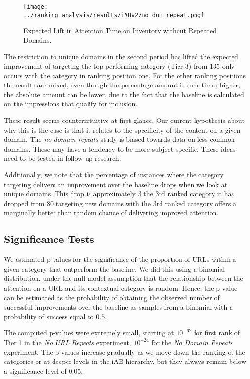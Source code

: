 \documentclass[sigconf]{acmart}
\begin{document}
\begin{figure*}
\texttt{[image: ../ranking\_analysis/results/iABv2/no\_dom\_repeat.png]}
\caption{Expected Lift in Attention Time on Inventory without Repeated Domains.}
\label{fig:no_dom}
\end{figure*}

The restriction to unique domains in the second period has lifted the expected improvement
of targeting the top performing category (Tier 3) from 135%
only occurs with the category in ranking position one. For the other ranking positions
the results are mixed, even though the percentage amount is sometimes higher, the
absolute amount can be lower, due to the fact that the baseline is calculated on
the impressions that qualify for inclusion.

These result seems counterintuitive at first glance. Our current hypothesis about why
this is the case is that it relates to the specificity of the content on a given domain.
The \emph{no domain repeats} study is biased towards data on less common domains.
These may have a tendency to be more subject specific.
These ideas need to be tested in follow up research.

Additionally, we note that the percentage of instances where the category targeting
delivers an improvement over the baseline drops when we look at unique domains.
This drop is approximately 3%
the 3rd ranked category it has dropped from 80%
targeting new domains with the 3rd ranked category offers a marginally better than
random chance of delivering improved attention.

\subsection{Significance Tests}

We estimated p-values for the significance of the proportion of URLs within a given category
that outperform the baseline. We did this using a binomial distribution, under the null model
assumption that the relationship between the attention on a URL and its contextual category
is random. Hence, the p-value can be estimated as the probability of obtaining the observed
number of successful improvements over the baseline as samples from a binomial with a probability
of success equal to $0.5$.

The computed p-values were extremely small, starting at $10^{-62}$ for first rank of Tier 1 in
the \emph{No URL Repeats} experiment, $10^{-24}$ for the \emph{No Domain Repeats} experiment.
The p-values increase gradually as we move down the ranking of the categories or at deeper
levels in the iAB hierarchy, but they always remain below a significance level
of 0.05.
\end{document}
